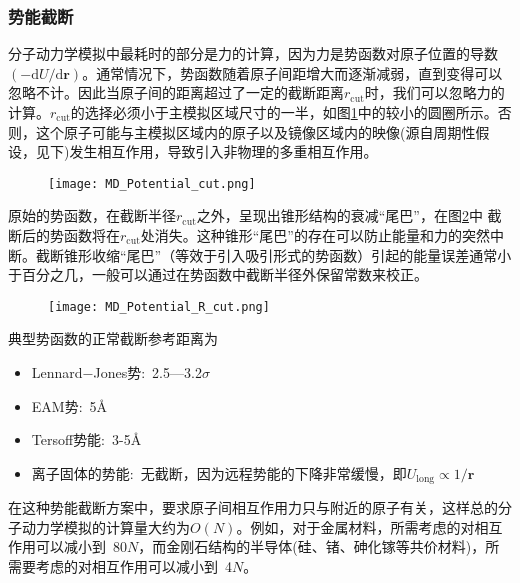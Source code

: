 \subsubsection{势能截断}
分子动力学模拟中最耗时的部分是力的计算，因为力是势函数对原子位置的导数$(-\mathrm{d}U/\mathrm{d}\mathbf{r})$。通常情况下，势函数随着原子间距增大而逐渐减弱，直到变得可以忽略不计。因此当原子间的距离超过了一定的截断距离$r_{\mathrm{cut}}$时，我们可以忽略力的计算。$r_{\mathrm{cut}}$的选择必须小于主模拟区域尺寸的一半，如图\ref{MD_R_cut}中的较小的圆圈所示。否则，这个原子可能与主模拟区域内的原子以及镜像区域内的映像(源自周期性假设，见下)发生相互作用，导致引入非物理的多重相互作用。
\begin{figure}[h!]
\centering
\vspace*{-0.1in}
\texttt{[image: MD\_Potential\_cut.png]}
\caption{\fontsize{7.2pt}{4.2pt}\selectfont{二维平面内周期边界条件下势能截断范围(小圆圈)和近邻列表范围(大圆圈)示意图，中心为主模拟区域，周围是镜像模拟区.}}%
\label{MD_R_cut}
\end{figure}
原始的势函数，在截断半径$r_{\mathrm{cut}}$之外，呈现出锥形结构的衰减“尾巴”，在图\ref{Potential_R_cut}中 截断后的势函数将在$r_{\mathrm{cut}}$处消失。这种锥形“尾巴”的存在可以防止能量和力的突然中断。截断锥形收缩“尾巴”（等效于引入吸引形式的势函数）引起的能量误差通常小于百分之几，一般可以通过在势函数中截断半径外保留常数来校正。
\begin{figure}[h!]
\centering
\vspace*{-0.1in}
\texttt{[image: MD\_Potential\_R\_cut.png]}
\caption{\fontsize{7.2pt}{4.2pt}}%
\label{Potential_R_cut}
\end{figure}

典型势函数的正常截断参考距离为
\begin{itemize}
	\item \textrm{Lennard−Jones}势:~2.5—3.2$\sigma$
	\item \textrm{EAM}势:~5\AA
	\item \textrm{Tersoff}势能:~3-5\AA
	\item 离子固体的势能:~无截断，因为远程势能的下降非常缓慢，即$U_{\mathrm{long}}\propto1/\mathbf{r}$
\end{itemize}
在这种势能截断方案中，要求原子间相互作用力只与附近的原子有关，这样总的分子动力学模拟的计算量大约为$O(N)$。例如，对于金属材料，所需考虑的对相互作用可以减小到~80$N$，而金刚石结构的半导体(硅、锗、砷化镓等共价材料)，所需要考虑的对相互作用可以减小到~4$N$。

